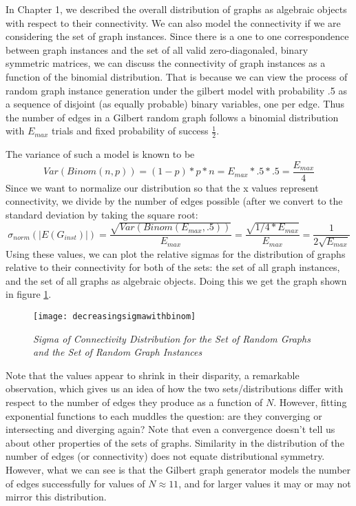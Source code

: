 In Chapter 1, we described the overall distribution of graphs as algebraic objects with respect to their connectivity.
We can also model the connectivity if we are considering the set of graph instances.
Since there is a one to one correspondence between graph instances and the set of all valid zero-diagonaled, binary symmetric matrices, we can discuss the connectivity of graph instances as a function of the binomial distribution.
That is because we can view the process of random graph instance generation under the gilbert model with probability .5 as a sequence of disjoint (as equally probable) binary variables, one per edge.
Thus the number of edges in a Gilbert random graph follows a binomial distribution with $E_{max}$ trials and fixed probability of success $\frac{1}{2}$.

The variance of such a model is known to be 
$$Var(Binom(n, p)) = (1-p) * p * n = E_{max} * .5 * .5 = \frac{E_{max}}{4}$$
Since we want to normalize our distribution so that the x values represent connectivity, we divide by the number of edges possible (after we convert to the standard deviation by taking the square root:
$$\sigma_{norm}(|E(G_{inst})|) = \frac{\sqrt{Var(Binom(E_{max}, .5))}}{E_{max}} = \frac{\sqrt{1/4 * E_{max}}}{E_{max}}  = \frac{1}{2\sqrt{E_{max}}}$$
Using these values, we can plot the relative sigmas for the distribution of graphs relative to their connectivity for both of the sets: the set of all graph instances, and the set of all graphs as algebraic objects.
Doing this we get the graph shown in figure \ref{fig:sigmaconvergence}.

\begin{figure}[h]
\caption{\emph{Sigma of Connectivity Distribution for the Set of Random Graphs and the Set of Random Graph Instances}}
\centering
\texttt{[image: decreasingsigmawithbinom]}
\label{fig:sigmaconvergence}
\end{figure}

Note that the values appear to shrink in their disparity, a remarkable observation, which gives us an idea of how the two sets/distributions differ with respect to the number of edges they produce as a function of $N$.
However, fitting exponential functions to each muddles the question: are they converging or intersecting and diverging again?
Note that even a convergence doesn't tell us about other properties of the sets of graphs.
Similarity in the distribution of the number of edges (or connectivity) does not equate distributional symmetry.
However, what we can see is that the Gilbert graph generator models the number of edges successfully for values of $N \approx 11$, and for larger values it may or may not  mirror this distribution.

